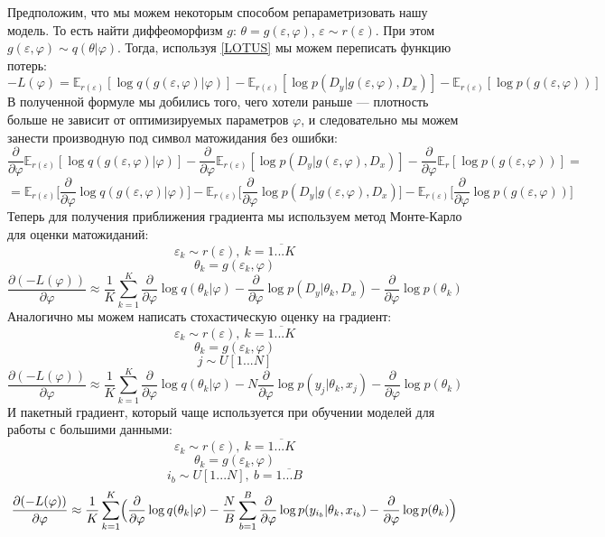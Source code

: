 Предположим, что мы можем некоторым способом репараметризовать нашу модель. То есть найти диффеоморфизм $g$: $\theta = g(\varepsilon, \varphi)$, $\varepsilon \sim r(\varepsilon)$.
 При этом $g(\varepsilon, \varphi) \sim q(\theta | \varphi)$. Тогда, используя \ref{LOTUS} мы можем переписать функцию потерь:
$$-L(\varphi) = \mathbb{E}_{r(\varepsilon)}[\log q(g(\varepsilon, \varphi) | \varphi)] - \mathbb{E}_{r(\varepsilon)}[\log p(D_y | g(\varepsilon, \varphi), D_x)] - \mathbb{E}_{r(\varepsilon)}[\log p(g(\varepsilon, \varphi))]$$
В полученной формуле мы добились того, чего хотели раньше --- плотность больше не зависит от оптимизируемых параметров $\varphi$, и следовательно мы можем занести производную под символ матожидания без ошибки:
$$\frac{\partial}{\partial\varphi} \mathbb{E}_{r(\varepsilon)}[\log q(g(\varepsilon, \varphi) | \varphi)] -
\frac{\partial}{\partial\varphi}\mathbb{E}_{r(\varepsilon)}[\log p(D_y | g(\varepsilon, \varphi), D_x)] -
\frac{\partial}{\partial\varphi} \mathbb{E}_{r}[\log p(g(\varepsilon, \varphi))]=$$
$$=\mathbb{E}_{r(\varepsilon)}\bigl[\frac{\partial}{\partial\varphi} \log q(g(\varepsilon, \varphi) | \varphi)\bigr] -
\mathbb{E}_{r(\varepsilon)}\bigl[\frac{\partial}{\partial \varphi} \log p(D_y | g(\varepsilon, \varphi), D_x)\bigr] -
\mathbb{E}_{r(\varepsilon)}\bigl[\frac{\partial}{\partial\varphi} \log p(g(\varepsilon, \varphi))\bigr]$$
Теперь для получения приближения градиента мы используем метод Монте-Карло для оценки матожиданий:
$$\varepsilon_k \sim r(\varepsilon),\ k=\overline{1...K}$$
$$\theta_k = g(\varepsilon_k, \varphi)$$
$$\frac{\partial (-L(\varphi))}{\partial\varphi} \approx \frac{1}{K} \sum_{k=1}^K \frac{\partial}{\partial\varphi} \log q(\theta_k | \varphi) -
\frac{\partial}{\partial\varphi} \log p(D_y | \theta_k, D_x) -
\frac{\partial}{\partial\varphi} \log p(\theta_k)$$
Аналогично мы можем написать стохастическую оценку на градиент:
$$\varepsilon_k \sim r(\varepsilon),\ k=\overline{1...K}$$
$$\theta_k = g(\varepsilon_k, \varphi)$$
$$j \sim U[1...N]$$
$$\frac{\partial (-L(\varphi))}{\partial\varphi} \approx \frac{1}{K} \sum_{k=1}^K \frac{\partial}{\partial\varphi} \log q(\theta_k | \varphi) -
N\frac{\partial}{\partial\varphi} \log p(y_j | \theta_k, x_j) -
\frac{\partial}{\partial\varphi} \log p(\theta_k)$$
И пакетный градиент, который чаще используется при обучении моделей для работы с большими данными:
$$\varepsilon_k \sim r(\varepsilon),\ k=\overline{1...K}$$
$$\theta_k = g(\varepsilon_k, \varphi)$$
$$i_b \sim U[1...N],\ b=\overline{1...B}$$
$$\frac{\partial (-L(\varphi))}{\partial\varphi} \approx \frac{1}{K} \sum_{k=1}^K \Bigl(\frac{\partial}{\partial\varphi} \log q(\theta_k | \varphi) -
\frac{N}{B}\sum_{b=1}^B \frac{\partial}{\partial\varphi} \log p(y_{i_b} | \theta_k, x_{i_b}) -
\frac{\partial}{\partial\varphi} \log p(\theta_k)\Bigr)$$

